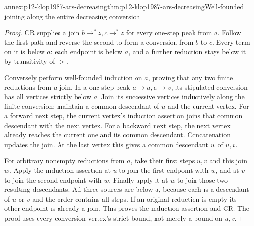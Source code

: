 \begin{annexitem}{annex:p12-klop1987-ars-decreasing}{thm:p12-klop1987-ars-decreasing}{Well-founded joining along the entire decreasing conversion}
\begin{proof}
CR supplies a join \(b\to^*z,c\to^*z\) for every one-step
peak from \(a\). Follow the first path and reverse the second to
form a conversion from \(b\) to \(c\). Every term on it is
below \(a\): each endpoint is below \(a\), and a further
reduction stays below it by transitivity of \(>\).

Conversely perform well-founded induction on \(a\), proving that
any two finite reductions from \(a\) join. In a one-step peak
\(a\to u,a\to v\), its stipulated conversion has all vertices
strictly below \(a\). Join its successive vertices inductively along
the finite conversion: maintain a common descendant of \(u\) and
the current vertex. For a forward next step, the current vertex's
induction assertion joins that common descendant with the next vertex.
For a backward next step, the next vertex already reaches the current
one and its common descendant. Concatenation updates the join. At the
last vertex this gives a common descendant \(w\) of \(u,v\).

For arbitrary nonempty reductions from \(a\), take their first
steps \(u,v\) and this join \(w\). Apply the induction assertion
at \(u\) to join the first endpoint with \(w\), and at
\(v\) to join the second endpoint with \(w\). Finally apply
it at \(w\) to join those two resulting descendants. All three
sources are below \(a\), because each is a descendant of \(u\)
or \(v\) and the order contains all steps. If an original reduction
is empty its other endpoint is already a join. This proves the induction
assertion and CR. The proof uses every conversion vertex's strict bound,
not merely a bound on \(u,v\).
\end{proof}
\end{annexitem}

